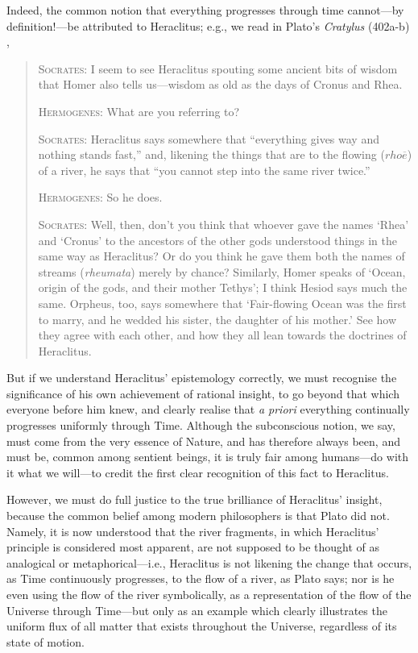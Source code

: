 Indeed, the common notion that everything progresses through time cannot---by definition!---be attributed to Heraclitus; e.g., we read in Plato's \textit{Cratylus} (402a-b) \cite{Plato1997},
\begin{quotation}
\textsc{Socrates}: I seem to see Heraclitus spouting some ancient bits of wisdom that Homer also tells us---wisdom as old as the days of Cronus and Rhea.

\textsc{Hermogenes}: What are you referring to?

\textsc{Socrates}: Heraclitus says somewhere that ``everything gives way and nothing stands fast,'' and, likening the things that are to the flowing ($rho\overline{e}$) of a river, he says that ``you cannot step into the same river twice.''

\textsc{Hermogenes}: So he does.

\textsc{Socrates}: Well, then, don't you think that whoever gave the names `Rhea' and `Cronus' to the ancestors of the other gods understood things in the same way as Heraclitus? Or do you think he gave them both the names of streams (\textit{rheumata}) merely by chance? Similarly, Homer speaks of `Ocean, origin of the gods, and their mother Tethys'; I think Hesiod says much the same. Orpheus, too, says somewhere that `Fair-flowing Ocean was the first to marry, and he wedded his sister, the daughter of his mother.' See how they agree with each other, and how they all lean towards the doctrines of Heraclitus.
\end{quotation}

But if we understand Heraclitus' epistemology correctly, we must recognise the significance of his own achievement of rational insight, to go beyond that which everyone before him knew, and clearly realise that \textit{a priori} everything continually progresses uniformly through Time. Although the subconscious notion, we say, must come from the very essence of Nature, and has therefore always been, and must be, common among sentient beings, it is truly fair among humans---do with it what we will---to credit the first clear recognition of this fact to Heraclitus.

However, we must do full justice to the true brilliance of Heraclitus' insight, because the common belief among modern philosophers is that Plato did not. Namely, it is now understood that the river fragments, in which Heraclitus' principle is considered most apparent, are not supposed to be thought of as analogical or metaphorical---i.e., Heraclitus is not likening the change that occurs, as Time continuously progresses, to the flow of a river, as Plato says; nor is he even using the flow of the river symbolically, as a representation of the flow of the Universe through Time---but only as an example which clearly illustrates the uniform flux of all matter that exists throughout the Universe, regardless of its state of motion.

